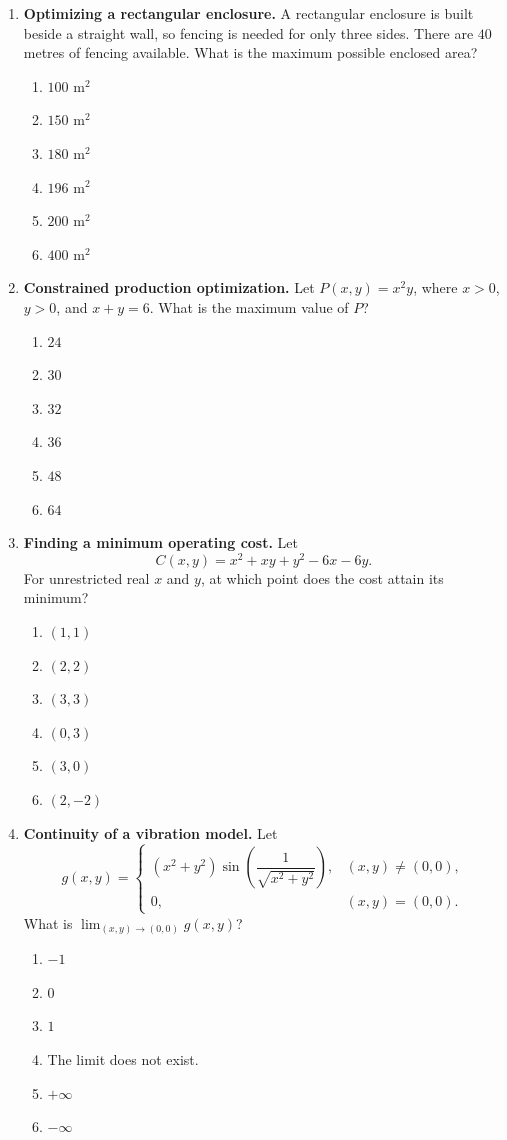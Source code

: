 \documentclass[a4paper,12pt]{article}
\theoremstyle{mystyle}
\numberwithin{equation}{section}
\numberwithin{theorem}{section}
\numberwithin{proposition}{section}
\numberwithin{example}{section}
\numberwithin{remark}{section}
\numberwithin{lemma}{section}
\numberwithin{corollary}{section}
\numberwithin{definition}{section}
\begin{document}
\begin{enumerate}[label=\textbf{Question \arabic*.},leftmargin=*]
\item \textbf{Optimizing a rectangular enclosure.} A rectangular enclosure is built beside a straight wall, so fencing is needed for only three sides. There are $40$ metres of fencing available. What is the maximum possible enclosed area?
\begin{enumerate}[label=(\Alph*)]
\item $100\text{ m}^2$
\item $150\text{ m}^2$
\item $180\text{ m}^2$
\item $196\text{ m}^2$
\item $200\text{ m}^2$
\item $400\text{ m}^2$
\end{enumerate}

\item \textbf{Constrained production optimization.} Let $P(x,y)=x^2y$, where $x>0$, $y>0$, and $x+y=6$. What is the maximum value of $P$?
\begin{enumerate}[label=(\Alph*)]
\item $24$
\item $30$
\item $32$
\item $36$
\item $48$
\item $64$
\end{enumerate}

\item \textbf{Finding a minimum operating cost.} Let
\[
C(x,y)=x^2+xy+y^2-6x-6y.
\]
For unrestricted real $x$ and $y$, at which point does the cost attain its minimum?
\begin{enumerate}[label=(\Alph*)]
\item $(1,1)$
\item $(2,2)$
\item $(3,3)$
\item $(0,3)$
\item $(3,0)$
\item $(2,-2)$
\end{enumerate}

\item \textbf{Continuity of a vibration model.} Let
\[
g(x,y)=
\begin{cases}
(x^2+y^2)\sin \left(\dfrac{1}{\sqrt{x^2+y^2}}\right),
& (x,y)\ne(0,0),\\[6pt]
0,&(x,y)=(0,0).
\end{cases}
\]
What is $\displaystyle\lim_{(x,y)\to(0,0)}g(x,y)$?
\begin{enumerate}[label=(\Alph*)]
\item $-1$
\item $0$
\item $1$
\item The limit does not exist.
\item $+\infty$
\item $-\infty$
\end{enumerate}


\end{enumerate}
\end{document}
